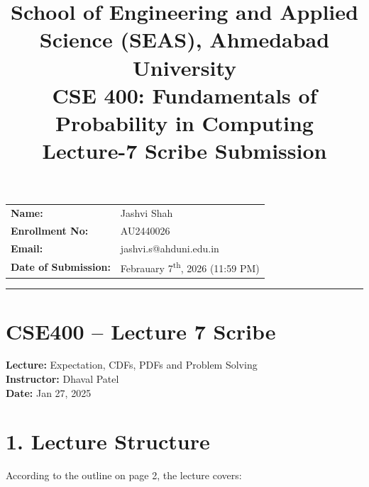 \documentclass[11pt]{article}
\title{
    \normalsize School of Engineering and Applied Science (SEAS), Ahmedabad University \\
    \vspace{0.2cm}
    \textbf{CSE 400: Fundamentals of Probability in Computing}\\
    \Large Lecture-7 Scribe Submission
}
\author{}
\date{}
\begin{document}
\maketitle

\vspace{-2cm}
\begin{center}
    \begin{tabular}{ll}
        \textbf{Name:} & {Jashvi Shah \hspace{2.5in}} \\ [1.5ex]
        \textbf{Enrollment No:} & {AU2440026 \hspace{2.5in}} \\ [1.5ex]
        \textbf{Email:} & {jashvi.s@ahduni.edu.in \hspace{2.1in}} \\ [1.5ex]
        \textbf{Date of Submission:} & {Febrauary 7\textsuperscript{th}, 2026 (11:59 PM) \hspace{1.2in}}
    \end{tabular}
\end{center}

\hrule
\vspace{0.5cm}

\section*{CSE400 – Lecture 7 Scribe}


\textbf{Lecture:} Expectation, CDFs, PDFs and Problem Solving\\
\textbf{Instructor:} Dhaval Patel\\
\textbf{Date:} Jan 27, 2025

\bigskip

\section*{1. Lecture Structure}

According to the outline on page 2, the lecture covers:
\end{document}
